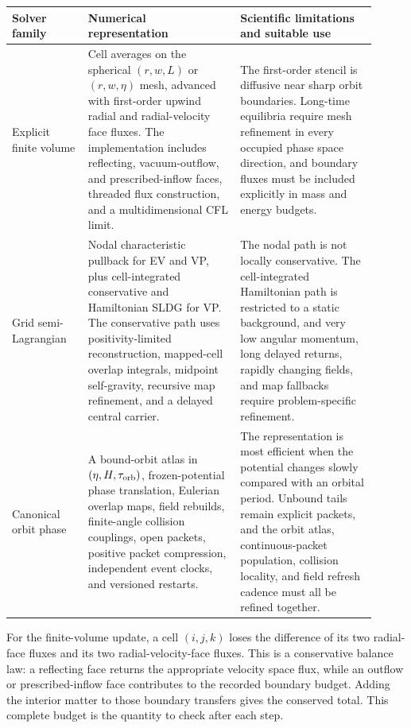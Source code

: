 \begin{center}
\footnotesize
\begin{tabular}{@{}>{\raggedright\arraybackslash}p{0.19\linewidth}
                  >{\raggedright\arraybackslash}p{0.38\linewidth}
                  >{\raggedright\arraybackslash}p{0.34\linewidth}@{}}
\toprule
Solver family & Numerical representation & Scientific limitations and suitable use \\
\midrule
Explicit finite volume &
Cell averages on the spherical \((r,w,L)\) or \((r,w,\eta)\) mesh, advanced
with first-order upwind radial and radial-velocity face fluxes.  The
implementation includes reflecting, vacuum-outflow, and prescribed-inflow
faces, threaded flux construction, and a multidimensional CFL limit. &
The first-order stencil is diffusive near sharp orbit boundaries.  Long-time
equilibria require mesh refinement in every occupied phase space direction,
and boundary fluxes must be included explicitly in mass and energy budgets. \\
\addlinespace
Grid semi-Lagrangian &
Nodal characteristic pullback for EV and VP, plus cell-integrated
conservative and Hamiltonian SLDG for VP.  The conservative path uses
positivity-limited reconstruction, mapped-cell overlap integrals, midpoint
self-gravity, recursive map refinement, and a delayed central carrier. &
The nodal path is not locally conservative.  The cell-integrated Hamiltonian
path is restricted to a static background, and very low angular momentum,
long delayed returns, rapidly changing fields, and map fallbacks require
problem-specific refinement. \\
\addlinespace
Canonical orbit phase &
A bound-orbit atlas in \((\eta,H,\tau_{\rm orb})\), frozen-potential phase translation,
Eulerian overlap maps, field rebuilds, finite-angle collision couplings, open
packets, positive packet compression, independent event clocks, and
versioned restarts. &
The representation is most efficient when the potential changes slowly
compared with an orbital period.  Unbound tails remain explicit packets, and
the orbit atlas, continuous-packet population, collision locality, and field
refresh cadence must all be refined together. \\
\bottomrule
\end{tabular}
\end{center}

For the finite-volume update, a cell \((i,j,k)\) loses the difference of its
two radial-face fluxes and its two radial-velocity-face fluxes.  This is a
conservative balance law: a reflecting face returns the appropriate
velocity space flux, while an outflow or prescribed-inflow face contributes
to the recorded boundary budget.  Adding the interior matter to those
boundary transfers gives the conserved total.  This complete budget is the
quantity to check after each step.

